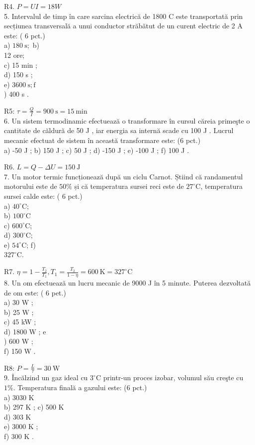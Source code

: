 R4. $P=U I=18 W$\\
5. Intervalul de timp în care sarcina electrică de 1800 C este transportată prin secțiunea transversală a unui conductor străbătut de un curent electric de 2 A este: ( 6 pct.)\\
a) $180 \mathrm{~s} ;$ b)\\
12 ore;\\
c) 15 min ;\\
d) 150 s ;\\
e) $3600 \mathrm{~s} ; \mathrm{f}$\\
) 400 s .

R5: $\tau=\frac{Q}{I}=900 \mathrm{~s}=15 \mathrm{~min}$\\
6. Un sistem termodinamic efectuează o transformare în cursul căreia primeşte o cantitate de căldură de 50 J , iar energia sa internă scade cu 100 J . Lucrul mecanic efectuat de sistem în această transformare este: (6 pct.)\\
a) -50 J ; b) 150 J ; c) 50 J ; d) -150 J ; e) -100 J ; f) 100 J .

R6. $L=Q-\Delta U=150 \mathrm{~J}$\\
7. Un motor termic funcționează după un ciclu Carnot. Știind că randamentul motorului este de $50 \%$ și că temperatura sursei reci este de $27^{\circ} \mathrm{C}$, temperatura sursei calde este: ( 6 pct.)\\
a) $40^{\circ} \mathrm{C}$;\\
b) $100^{\circ} \mathrm{C}$\\
c) $600^{\circ} \mathrm{C}$;\\
d) $300^{\circ} \mathrm{C}$;\\
e) $54^{\circ} \mathrm{C}$; f)\\
$327^{\circ} \mathrm{C}$.

R7. $\eta=1-\frac{T_{2}}{T_{1}}, T_{1}=\frac{T_{2}}{1-\eta}=600 \mathrm{~K}=327^{\circ} \mathrm{C}$\\
8. Un om efectuează un lucru mecanic de 9000 J în 5 minute. Puterea dezvoltată de om este: ( 6 pet.)\\
a) 30 W ;\\
b) 25 W ;\\
c) 45 kW ;\\
d) 1800 W ; e\\
) 600 W ;\\
f) 150 W .

R8: $P=\frac{L}{\tau}=30 \mathrm{~W}$\\
9. Încălzind un gaz ideal cu $3^{\circ} \mathrm{C}$ printr-un proces izobar, volumul său creşte cu $1 \%$. Temperatura finală a gazului este: (6 pct.)\\
a) 3030 K\\
b) 297 K ; c) 500 K\\
d) 303 K\\
e) 3000 K ;\\
f) 300 K .

